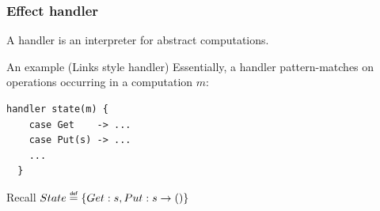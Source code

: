\begin{frame}[fragile]
  \frametitle{Effect handler}
  \begin{definition}[Handler]
    A handler is an interpreter for abstract computations.
  \end{definition}
  \begin{block}{An example (Links style handler)}
    Essentially, a handler pattern-matches on operations occurring in a computation $m$:
    \begin{lstlisting}[style=spacey]
  handler state(m) {
    case Get    -> ...
    case Put(s) -> ...
    ...
  }
    \end{lstlisting}
Recall $State \defas \{ Get : s, Put : s \to () \}$
  \end{block}
\end{frame}






